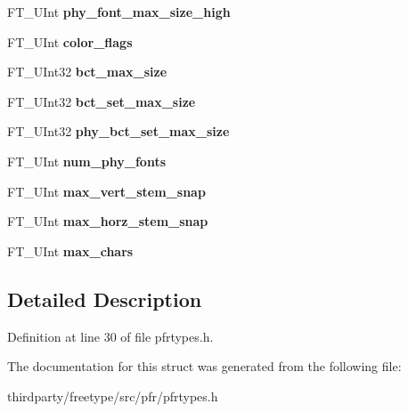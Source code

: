 \begin{DoxyCompactItemize}
\item 
\mbox{\label{struct_p_f_r___header_rec___a9686e272a39dce6a1690f201537256cc}} 
F\+T\+\_\+\+U\+Int {\bfseries phy\+\_\+font\+\_\+max\+\_\+size\+\_\+high}
\item 
\mbox{\label{struct_p_f_r___header_rec___a7c420c3bed3c4afc484409ad6e5088c8}} 
F\+T\+\_\+\+U\+Int {\bfseries color\+\_\+flags}
\item 
\mbox{\label{struct_p_f_r___header_rec___a68cedb26e058ed3f665bd17b9adb4926}} 
F\+T\+\_\+\+U\+Int32 {\bfseries bct\+\_\+max\+\_\+size}
\item 
\mbox{\label{struct_p_f_r___header_rec___ab836e08af6229ff3378e7037253aad7c}} 
F\+T\+\_\+\+U\+Int32 {\bfseries bct\+\_\+set\+\_\+max\+\_\+size}
\item 
\mbox{\label{struct_p_f_r___header_rec___ae5453ab1e9bf09e69944e70b363ae30e}} 
F\+T\+\_\+\+U\+Int32 {\bfseries phy\+\_\+bct\+\_\+set\+\_\+max\+\_\+size}
\item 
\mbox{\label{struct_p_f_r___header_rec___a3c9731b17a6ae185bb11a77bf9f6f1b1}} 
F\+T\+\_\+\+U\+Int {\bfseries num\+\_\+phy\+\_\+fonts}
\item 
\mbox{\label{struct_p_f_r___header_rec___a097711d27ae03f3420fb1f398beefa69}} 
F\+T\+\_\+\+U\+Int {\bfseries max\+\_\+vert\+\_\+stem\+\_\+snap}
\item 
\mbox{\label{struct_p_f_r___header_rec___a12e630ec7b2eee29da74296c0a096ad2}} 
F\+T\+\_\+\+U\+Int {\bfseries max\+\_\+horz\+\_\+stem\+\_\+snap}
\item 
\mbox{\label{struct_p_f_r___header_rec___a6ce19a8c69848414003f324b501e0688}} 
F\+T\+\_\+\+U\+Int {\bfseries max\+\_\+chars}
\end{DoxyCompactItemize}


\subsection{Detailed Description}


Definition at line 30 of file pfrtypes.\+h.



The documentation for this struct was generated from the following file\+:\begin{DoxyCompactItemize}
\item 
thirdparty/freetype/src/pfr/pfrtypes.\+h\end{DoxyCompactItemize}
